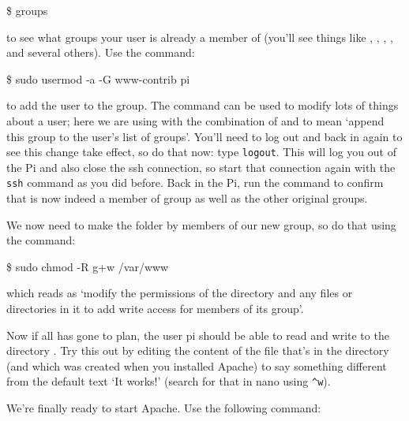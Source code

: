 \begin{ttoutenv}
\$ groups
\end{ttoutenv}

to see what groups your user is already a member of (you'll see things
like , , , ,
 and several others). Use the command:

\begin{ttoutenv}
\$ sudo usermod -a -G www-contrib pi
\end{ttoutenv}

to add the  user to the  group. The
 command can be used to modify lots of things
about a user; here we are using with the combination of  and
 to mean `append this group to the user's list of
groups'. You'll need to log out and back in again to see this change
take effect, so do that now: type \verb+logout+. This will log you out
of the Pi and also close the ssh connection, so start that connection
again with the \verb+ssh+ command as you did before. Back in the Pi,
run the  command to confirm that  is now
indeed a member of group  as well as the other
original groups.


We now need to make the  folder  by
members of our new group, so do that using the command:

\begin{ttoutenv}
\$ sudo chmod -R g+w /var/www
\end{ttoutenv}

which reads as `modify the permissions of the directory
 and any files or directories in it to add write access
for members of its group'.

Now if all has gone to plan, the user pi should be able to read and
write to the directory . Try this out by editing the
content of the  file that's in the 
directory (and which was created when you installed Apache) to say
something different from the default text `It works!' (search for that
in nano using \verb+^w+).

We're finally ready to start Apache. Use the following command:

